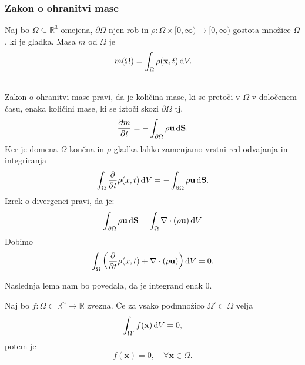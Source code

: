 \documentclass[mat2, tisk]{fmfdelo}
\newcommand{\R}{\mathbb R}
\newcommand{\bd}{\textbf}
\begin{document}
\subsubsection{Zakon o ohranitvi mase}
Naj bo $\Omega \subseteq \R^3$ omejena, $\partial \Omega$ njen rob in $\rho: \Omega \times [0, \infty) \rightarrow [0, \infty)$ 
gostota množice $\Omega$, ki je gladka. Masa $m$ od $\Omega$ je 
\begin{equation}
  m(\Omega) = \int_\Omega \rho(\bd{x}, t) \dif V.
\end{equation}
\begin{center}
\end{center}
~\\[1mm]

Zakon o ohranitvi mase pravi, da je količina mase, ki se pretoči v $\Omega$ v določenem času, 
enaka količini mase, ki se iztoči skozi $\partial\Omega$ tj.
$$
\frac{\partial m}{\partial t} = - \int_{\partial \Omega} \rho\bd{u} \dif \bd{S}.
$$
Ker je domena $\Omega$ končna in $\rho$ gladka lahko zamenjamo vrstni red odvajanja in integriranja
$$
\int_\Omega \frac{\partial}{\partial t} \rho(x, t) \dif V = - \int_{\partial \Omega} \rho \bd{u} \dif \bd{S}.
$$
Izrek o divergenci pravi, da je:
$$
\int_{\partial \Omega} \rho\bd{u} \dif \bd{S} = \int_{\Omega} \nabla \cdot (\rho\bd{u}) \dif V
$$
Dobimo 
\begin{align*}
\int_\Omega \left(\frac{\partial}{\partial t} \rho(x, t) + \nabla \cdot (\rho\bd{u})\right) \dif V = 0.
\end{align*}

Naslednja lema nam bo povedala, da je integrand enak 0.

\begin{lema}
Naj bo $f: \Omega \subset \R^n \rightarrow \R$ zvezna. 
Če za vsako podmnožico $\Omega' \subset \Omega$ velja 
$$
\int_{\Omega'} f(\bd{x}) \dif V = 0,
$$
potem je 
$$
f(\bd{x}) = 0, \quad \forall \bd{x} \in \Omega.
$$
\end{lema}
\end{document}
